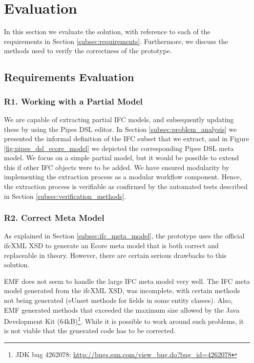 \section{Evaluation}
\label{sec:evaluation}
In this section we evaluate the solution, with reference to each of the requirements in Section \ref{subsec:requirements}. Furthermore, we discuss the methods used to verify the correctness of the prototype.


\subsection{Requirements Evaluation}
\label{subsec:requirements_evaluation}
\subsubsection{R1. Working with a Partial Model}
We are capable of extracting partial IFC models, and subsequently updating these by using the Pipes DSL editor. In Section \ref{subsec:problem_analysis} we presented the informal definition of the IFC subset that we extract, and in Figure \ref{fig:pipes_dsl_ecore_model} we depicted the corresponding Pipes DSL meta model. We focus on a simple partial model, but it would be possible to extend this if other IFC objects were to be added. We have ensured modularity by implementing the extraction process as a modular workflow component. Hence, the extraction process is verifiable as confirmed by the automated tests described in Section \ref{subsec:verification_methods}.

\subsubsection{R2. Correct Meta Model} As explained in Section \ref{subsec:ifc_meta_model}, the prototype uses the official ifcXML XSD to generate an Ecore meta model that is both correct and replaceable in theory. However, there are certain serious drawbacks to this solution.

EMF does not seem to handle the large IFC meta model very well. The IFC meta model generated from the ifcXML XSD, was incomplete, with certain methods not being generated (eUnset methods for fields in some entity classes). Also, EMF generated methods that exceeded the maximum size allowed by the Java Development Kit (64kB)\footnote{JDK bug 4262078: \url{http://bugs.sun.com/view_bug.do?bug_id=4262078}}. While it is possible to work around such problems, it is not viable that the generated code has to be corrected.

